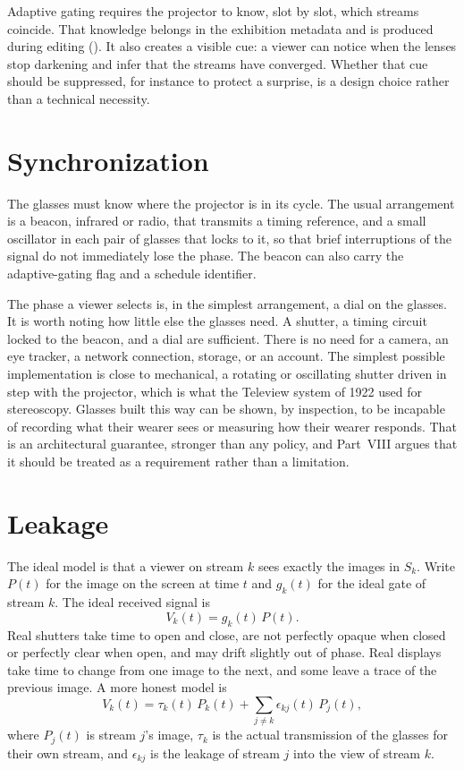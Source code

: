 Adaptive gating requires the projector to know, slot by slot, which streams coincide. That knowledge belongs in the exhibition metadata and is produced during editing (). It also creates a visible cue: a viewer can notice when the lenses stop darkening and infer that the streams have converged. Whether that cue should be suppressed, for instance to protect a surprise, is a design choice rather than a technical necessity.

\section{Synchronization}

The glasses must know where the projector is in its cycle. The usual arrangement is a beacon, infrared or radio, that transmits a timing reference, and a small oscillator in each pair of glasses that locks to it, so that brief interruptions of the signal do not immediately lose the phase. The beacon can also carry the adaptive-gating flag and a schedule identifier.

The phase a viewer selects is, in the simplest arrangement, a dial on the glasses. It is worth noting how little else the glasses need. A shutter, a timing circuit locked to the beacon, and a dial are sufficient. There is no need for a camera, an eye tracker, a network connection, storage, or an account. The simplest possible implementation is close to mechanical, a rotating or oscillating shutter driven in step with the projector, which is what the Teleview system of 1922 used for stereoscopy. Glasses built this way can be shown, by inspection, to be incapable of recording what their wearer sees or measuring how their wearer responds. That is an architectural guarantee, stronger than any policy, and Part~VIII argues that it should be treated as a requirement rather than a limitation.

\section{Leakage}

The ideal model is that a viewer on stream $k$ sees exactly the images in $S_k$. Write $P(t)$ for the image on the screen at time $t$ and $g_k(t)$ for the ideal gate of stream $k$. The ideal received signal is
\begin{equation}
V_k(t)=g_k(t)\,P(t).
\end{equation}
Real shutters take time to open and close, are not perfectly opaque when closed or perfectly clear when open, and may drift slightly out of phase. Real displays take time to change from one image to the next, and some leave a trace of the previous image. A more honest model is
\begin{equation}
V_k(t)=\tau_k(t)\,P_k(t)+\sum_{j\ne k}\epsilon_{kj}(t)\,P_j(t),
\end{equation}
where $P_j(t)$ is stream $j$'s image, $\tau_k$ is the actual transmission of the glasses for their own stream, and $\epsilon_{kj}$ is the leakage of stream $j$ into the view of stream $k$.

